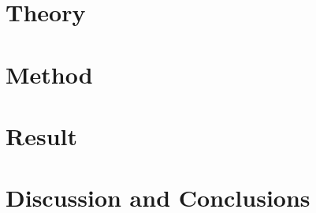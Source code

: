 \documentclass{article}
\begin{document}
\section{Theory}




\section{Method}




\section{Result}





\section{Discussion and Conclusions}



\newpage
\printbibliography %
\end{document}
